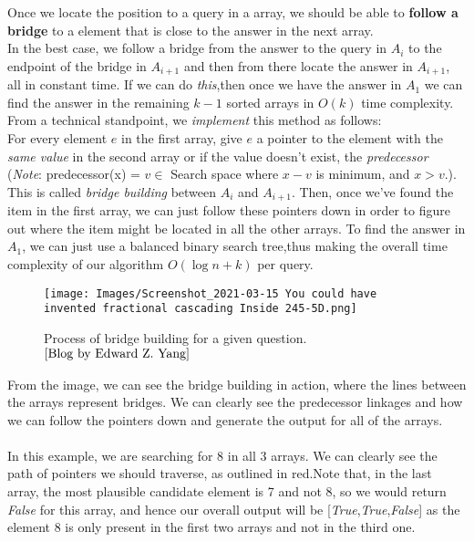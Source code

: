 \documentclass[11pt]{article}
\begin{document}
Once we locate the position to a query in a array, we should be able to \textbf{follow a bridge} to a element that is close to the answer in the next array. \\
In the best case, we follow a bridge from the answer to the query in $A_i$ to the endpoint of the bridge in $A_{i+1}$ and then from there locate the answer in $A_{i+1}$, all in constant time. If we can do \textit{this},then once we have the answer in $A_1$ we can find the answer in the remaining $k-1$ sorted arrays in $O(k)$ time complexity. \\

From a technical standpoint, we \textit{implement} this method as follows: \\
For every element $e$ in the first array, give $e$ a pointer to the element with the \textit{same value} in the second array or if the value doesn't exist, the \textit{predecessor} (\textit{Note}: predecessor(x) = $v \in $ Search space where $x-v$ is minimum, and $x>v$.). This is called \textit{bridge building} between $A_i$ and $A_{i+1}$. Then, once we've found the item in the first array, we can just follow these pointers down in order to figure out where the item might be located in all the other arrays. To find the answer in $A_1$, we can just use a balanced binary search tree,thus making the overall time complexity of our algorithm $O(\log n + k)$ per query.

\begin{figure}[H]
    \centering
    \texttt{[image: Images/Screenshot\_2021-03-15 You could have invented fractional cascading Inside 245-5D.png]}
    \caption{Process of bridge building for a given question.$^{\cite{Blog by Edward Z. Yang}}$}
    \label{fig:label}
\end{figure}

From the image, we can see the bridge building in action, where the lines between the arrays represent bridges. We can clearly see the predecessor linkages and how we can follow the pointers down and generate the output for all of the arrays. \\ \\ 
In this example, we are searching for 8 in all 3 arrays. We can clearly see the path of pointers we should traverse, as outlined in red.Note that, in the last array, the most plausible candidate element is 7 and not 8, so we would return \textit{False} for this array, and hence our overall output will be [\textit{True},\textit{True},\textit{False}] as the element 8 is only present in the first two arrays and not in the third one.
\end{document}
